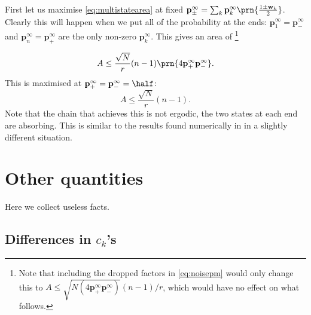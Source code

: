 \documentclass[12pt]{article}
\newcommand{\eq}{\mathbf{p}^\infty}
\newcommand{\w}{\mathbf{w}}
\begin{document}

First let us maximise \eqref{eq:multistatearea} at fixed $\eq_\pm = \sum_k \eq_k \prn{\frac{1\pm\w_k}{2}}$.
Clearly this will happen when we put all of the probability at the ends: $\eq_1=\eq_-$ and $\eq_n=\eq_+$ are the only non-zero $\eq_k$.
This gives an area of
\footnote{Note that including the dropped factors in \eqref{eq:noisepm} would only change this to $A \leq \sqrt{N(4\eq_+\eq_-)}(n-1)/r$, which would have no effect on what follows.}

%
\begin{equation}\label{eq:multistateextarea}
  A \leq \frac{\sqrt{N}}{r}(n-1)\prn{4\eq_+\eq_-}.
\end{equation}
%
This is maximised at $\eq_+=\eq_-=\half$:
%
\begin{equation}\label{eq:maxarea}
  A \leq \frac{\sqrt{N}}{r}(n-1).
\end{equation}
%
Note that the chain that achieves this is not ergodic, the two states at each end are absorbing. This is similar to the results found numerically in \cite{Barrett2008discrete} in a slightly different situation.


\appendix
\section{Other quantities}

Here we collect useless facts.

\subsection{Differences in \texorpdfstring{$c_k$}{c(k)}'s}\label{sec:areacoeffdiff}
\end{document}

